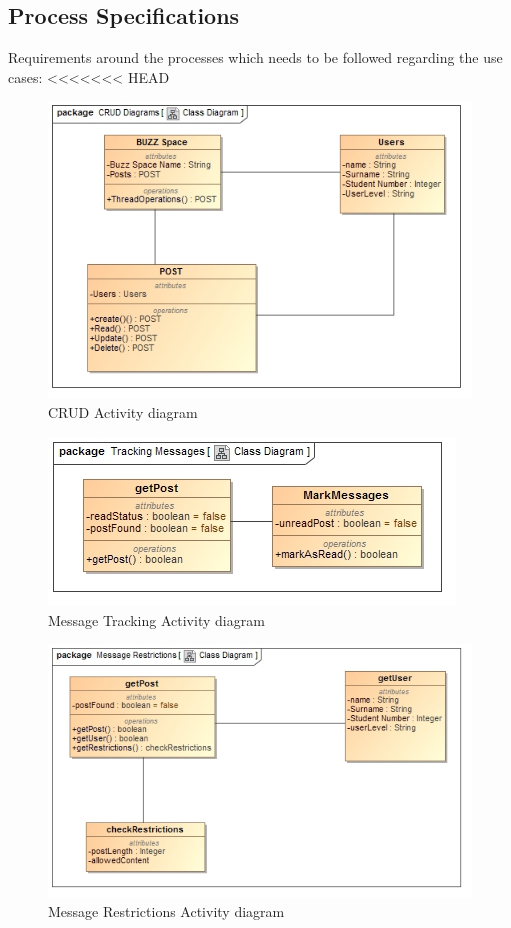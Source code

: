 \documentclass[11pt]{article}
\begin{document}
\subsection{Process Specifications}
Requirements around the processes which needs to be followed regarding the use cases: \newline
<<<<<<< HEAD
\graphicspath{ {../Diagrams/Kyhle/Activity_Diagrams/} }
	\begin{figure}[H]	
    	\includegraphics[scale=0.5]{CRUD.jpg}
    	\caption{CRUD Activity diagram}
	\end{figure}
    	
	\begin{figure}[H]	
    	\includegraphics[scale=0.5]{messageTracking.jpg}
    	\caption{Message Tracking Activity diagram}
	\end{figure}
	
	\begin{figure}[H]	
    	\includegraphics[scale=0.5]{messageRestrictions.jpg}
    	\caption{Message Restrictions Activity diagram}
	\end{figure}
\end{document}
